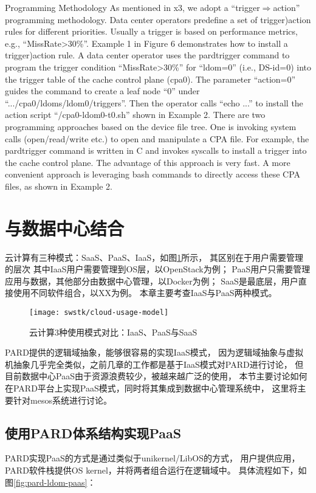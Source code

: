 Programming Methodology
As mentioned in x3, we adopt a ``trigger$\Rightarrow$action'' programming
methodology. Data center operators predefine a set of trigger)action
rules for different priorities. Usually a trigger is based on performance
metrics, e.g., ``MissRate>30\%''.
Example 1 in Figure 6 demonstrates how to install a trigger)action
rule. A data center operator uses the pardtrigger command to program
the trigger condition ``MissRate>30\%'' for ``ldom=0'' (i.e.,
DS-id=0) into the trigger table of the cache control plane (cpa0).
The parameter ``action=0'' guides the command to create a leaf
node ``0'' under ``.../cpa0/ldoms/ldom0/triggers''. Then the operator
calls ``echo ...'' to install the action script ``/cpa0-ldom0-t0.sh''
shown in Example 2.
There are two programming approaches based on the device file
tree. One is invoking system calls (open/read/write etc.) to open
and manipulate a CPA file. For example, the pardtrigger command
is written in C and invokes syscalls to install a trigger into the
cache control plane. The advantage of this approach is very fast. A
more convenient approach is leveraging bash commands to directly
access these CPA files, as shown in Example 2.


\section{与数据中心结合}

云计算有三种模式：SaaS、PaaS、IaaS，如图\ref{fig:cloud-usage-model}所示，
其区别在于用户需要管理的层次
其中IaaS用户需要管理到OS层，以OpenStack为例；
PaaS用户只需要管理应用与数据，其他部分由数据中心管理，以Docker为例；
SaaS是最底层，用户直接使用不同软件组合，以XX为例。
本章主要考查IaaS与PaaS两种模式。

\begin{figure}[tb]
  \centering
  \texttt{[image: swstk/cloud-usage-model]}
  \caption{云计算3种使用模式对比：IaaS、PaaS与SaaS}
  \label{fig:cloud-usage-model}
\end{figure}

PARD提供的逻辑域抽象，能够很容易的实现IaaS模式，
因为逻辑域抽象与虚拟机抽象几乎完全类似，之前几章的工作都是基于IaaS模式对PARD进行讨论，
但目前数据中心PaaS由于资源浪费较少，被越来越广泛的使用，
本节主要讨论如何在PARD平台上实现PaaS模式，同时将其集成到数据中心管理系统中，
这里将主要针对mesos系统进行讨论。

\subsection{使用PARD体系结构实现PaaS}
PARD实现PaaS的方式是通过类似于unikernel/LibOS的方式，
用户提供应用，PARD软件栈提供OS kernel，并将两者组合运行在逻辑域中。
具体流程如下，如图\ref{fig:pard-ldom-paas}：


